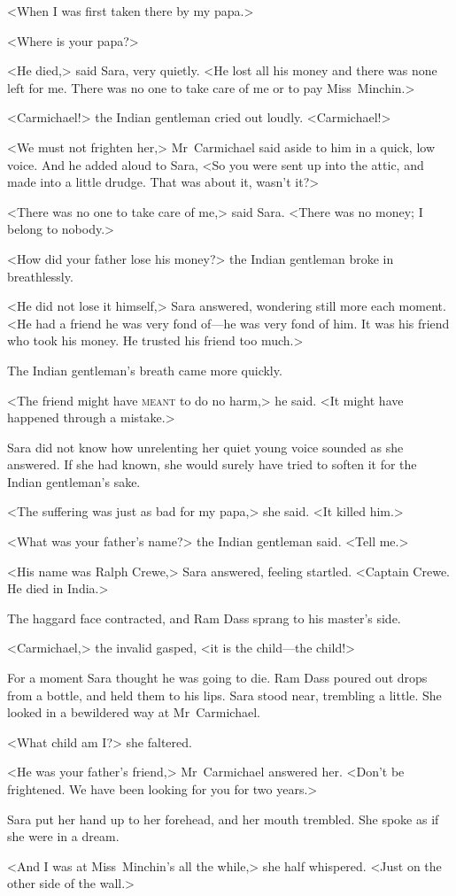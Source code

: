 <When I was first taken there by my papa.>

<Where is your papa?>

<He died,> said Sara, very quietly. <He lost all his money and there was none left for me. There was no one to take care of me or to pay Miss~Minchin.>

<Carmichael!> the Indian gentleman cried out loudly. <Carmichael!>

<We must not frighten her,> Mr~Carmichael said aside to him in a quick, low voice. And he added aloud to Sara, <So you were sent up into the attic, and made into a little drudge. That was about it, wasn't it?>

<There was no one to take care of me,> said Sara. <There was no money; I belong to nobody.>

<How did your father lose his money?> the Indian gentleman broke in breathlessly.

<He did not lose it himself,> Sara answered, wondering still more each moment. <He had a friend he was very fond of—he was very fond of him. It was his friend who took his money. He trusted his friend too much.>

The Indian gentleman's breath came more quickly.

<The friend might have \textsc{meant} to do no harm,> he said. <It might have happened through a mistake.>

Sara did not know how unrelenting her quiet young voice sounded as she answered. If she had known, she would surely have tried to soften it for the Indian gentleman's sake.

<The suffering was just as bad for my papa,> she said. <It killed him.>

<What was your father's name?> the Indian gentleman said. <Tell me.>

<His name was Ralph Crewe,> Sara answered, feeling startled. <Captain Crewe. He died in India.>

The haggard face contracted, and Ram Dass sprang to his master's side.

<Carmichael,> the invalid gasped, <it is the child—the child!>

For a moment Sara thought he was going to die. Ram Dass poured out drops from a bottle, and held them to his lips. Sara stood near, trembling a little. She looked in a bewildered way at Mr~Carmichael.

<What child am I\@?> she faltered.

<He was your father's friend,> Mr~Carmichael answered her. <Don't be frightened. We have been looking for you for two years.>

Sara put her hand up to her forehead, and her mouth trembled. She spoke as if she were in a dream.

<And I was at Miss~Minchin's all the while,> she half whispered. <Just on the other side of the wall.>

